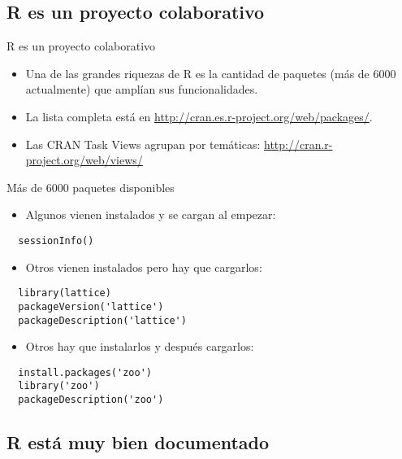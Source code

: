 \documentclass[xcolor={usenames,svgnames,dvipsnames}]{beamer}
\begin{document}
\subsection{R es un proyecto colaborativo}
\label{sec-1-2}
\begin{frame}[label=sec-1-2-1]{R es un proyecto colaborativo}
\begin{itemize}
\item Una de las grandes riquezas de R es la cantidad de paquetes (más
de 6000 actualmente) que amplían sus funcionalidades.
\item La lista completa está en \url{http://cran.es.r-project.org/web/packages/}.
\item Las CRAN Task Views agrupan por temáticas:
\url{http://cran.r-project.org/web/views/}
\end{itemize}
\end{frame}

\begin{frame}[fragile,label=sec-1-2-2]{Más de 6000 paquetes disponibles}
 \begin{itemize}
\item Algunos vienen instalados y se cargan al empezar:
\end{itemize}
\lstset{language=R,label= ,caption= ,numbers=none}
\begin{lstlisting}
  sessionInfo()
\end{lstlisting}
\begin{itemize}
\item Otros vienen instalados pero hay que cargarlos:
\end{itemize}
\lstset{language=R,label= ,caption= ,numbers=none}
\begin{lstlisting}
  library(lattice)
  packageVersion('lattice')
  packageDescription('lattice')
\end{lstlisting}
\begin{itemize}
\item Otros hay que instalarlos y después cargarlos:
\end{itemize}
\lstset{language=R,label= ,caption= ,numbers=none}
\begin{lstlisting}
  install.packages('zoo')
  library('zoo')
  packageDescription('zoo')
\end{lstlisting}
\end{frame}

\subsection{R está muy bien documentado}
\label{sec-1-3}
\end{document}
